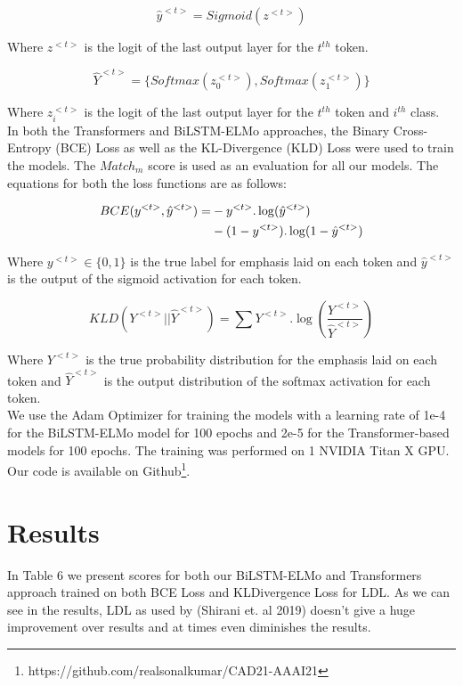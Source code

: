 \documentclass[letterpaper]{article} %
\begin{document}
\begin{equation}
{\hat{y}}^{<t>} = Sigmoid(z^{<t>})
\end{equation}

Where $z^{<t>}$ is the logit of the last output layer for the $t^{th}$ token.

\begin{equation}
{\hat{Y}}^{<t>} = \{Softmax(z_{0}^{<t>}),Softmax(z_{1}^{<t>})\}
\end{equation}

Where $z^{<t>}_i$ is the logit of the last output layer for the $t^{th}$ token and $i^{th}$ class.\\

In both the Transformers and BiLSTM-ELMo approaches, the Binary Cross-Entropy (BCE) Loss as well as the KL-Divergence (KLD) Loss were used to train the models. The $Match_m$ score is used as an evaluation for all our models. The equations for both the loss functions are as follows:

\begin{align}
BCE(y^{<t>},\hat{y}^{<t>}) = &- y^{<t>}.\log(\hat{y}^{<t>})\notag \\ &- (1-y^{<t>}).\log(1-\hat{y}^{<t>})
\end{align}

Where $y^{<t>}\in\{0,1\}$ is the true label for emphasis laid on each token and $\hat{y}^{<t>}$ is the output of the sigmoid activation for each token.

\begin{equation}
KLD(Y^{<t>}||\hat{Y}^{<t>}) = \sum Y^{<t>}.\log\left(\frac{Y^{<t>}}{\hat{Y}^{<t>}}\right)
\end{equation}

Where $Y^{<t>}$ is the true probability distribution for the emphasis laid on each token and $\hat{Y}^{<t>}$ is the output distribution of the softmax activation for each token.\\

We use the Adam Optimizer for training the models with a learning rate of 1e-4 for the BiLSTM-ELMo model for 100 epochs and 2e-5 for the Transformer-based models for 100 epochs. The training was performed on 1 NVIDIA Titan X GPU. Our code is available on Github\footnote{https://github.com/realsonalkumar/CAD21-AAAI21}.
\section{Results}
In Table 6 we present scores for both our BiLSTM-ELMo and Transformers approach trained on both BCE Loss and KLDivergence Loss for LDL. As we can see in the results, LDL as used by (Shirani et. al 2019) doesn't give a huge improvement over results and at times even diminishes the results.
\end{document}
